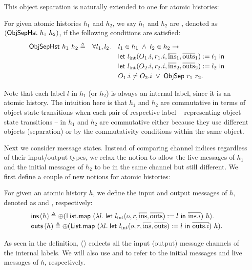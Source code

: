 This object separation is naturally extended to one for atomic histories:
\begin{definition}\label{def-obj-comm}
  For given atomic histories $h_1$ and $h_2$, we say $h_1$ and $h_2$ are , denoted as $(\mathsf{ObjSepHst}\ h_1\ h_2)$, if the following conditions are satisfied:
  \begin{displaymath}
    \renewcommand{\arraystretch}{1.2}
    \begin{array}{rcl}
      \objseph{h_1}{h_2} \triangleq & \forall l_1, l_2. & l_1 \in h_1 \;\wedge\; l_2 \in h_2 \to\\
      & & \mathsf{let}\ \lblInt{\idxOf{O_1}}{\idxOf{r_1}}{\listof{\mathrm{ins}}_1}{\listof{\mathrm{outs}}_1} := l_1\ \mathsf{in}\\
      & & \mathsf{let}\ \lblInt{\idxOf{O_2}}{\idxOf{r_2}}{\listof{\mathrm{ins}}_2}{\listof{\mathrm{outs}}_2} := l_2\ \mathsf{in}\\
      & & \idxOf{O_1} \neq \idxOf{O_2} \;\vee\; \objsep{r_1}{r_2}.
    \end{array}
  \end{displaymath}
\end{definition}
Note that each label $l$ in $h_1$ (or $h_2$) is always an internal label, since it is an atomic history.
The intuition here is that $h_1$ and $h_2$ are commutative in terms of object state transitions when each pair of respective label -- representing object state transitions -- in $h_1$ and $h_2$ are commutative either because they use different objects (separation) or by the commutativity conditions within the same object.

Next we consider message states.
Instead of comparing channel indices regardless of their input/output types, we relax the notion to allow the live messages of $h_1$ and the initial messages of $h_2$ to be in the same channel but still different.
We first define a couple of new notions for atomic histories:
\begin{definition}
  For given an atomic history $h$, we define the input and output messages of $h$, denoted as  and , respectively:
  \begin{displaymath}
    \renewcommand{\arraystretch}{1.2}
    \begin{array}{l}
      \ainputs{h} \triangleq \listconcat{(\mathsf{List.map}\ (\lambda l.\; \mathsf{let}\ \lblInt{o}{r}{\listof{\mathrm{ins}}}{\listof{\mathrm{outs}}} := l\ \mathsf{in}\ \listof{\idxOf{\mathrm{ins}}})\ h)}.\\
      \aoutputs{h} \triangleq \listconcat{(\mathsf{List.map}\ (\lambda l.\; \mathsf{let}\ \lblInt{o}{r}{\listof{\mathrm{ins}}}{\listof{\mathrm{outs}}} := l\ \mathsf{in}\ \listof{\idxOf{\mathrm{outs}}})\ h)}.
    \end{array}
  \end{displaymath}
\end{definition}
As seen in the definition,  () collects all the input (output) message channels of the internal labels.
We will also use  and  to refer to the initial messages and live messages of $h$, respectively.

